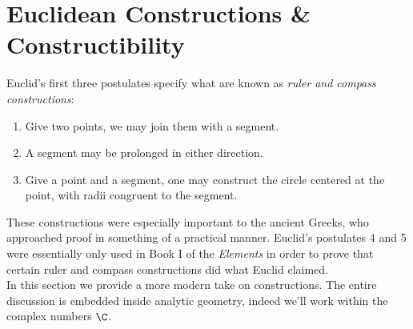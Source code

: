 \setcounter{section}{3}

\graphicspath{{lectures/4Constructions/asy/}}

\section{Euclidean Constructions \& Constructibility}
% 

Euclid's first three postulates specify what are known as \emph{ruler and compass constructions}:
\begin{enumerate}
  \item Give two points, we may join them with a segment.
  \item A segment may be prolonged in either direction.
  \item Give a point and a segment, one may construct the circle centered at the point, with radii congruent to the segment.
\end{enumerate}

These constructions were especially important to the ancient Greeks, who approached proof in something of a practical manner. Euclid's postulates 4 and 5 were essentially only used in Book I of the \emph{Elements} in order to prove that certain ruler and compass constructions did what Euclid claimed.\\[5pt]
In this section we provide a more modern take on constructions. The entire discussion is embedded inside analytic geometry, indeed we'll work within the complex numbers $\C$.

